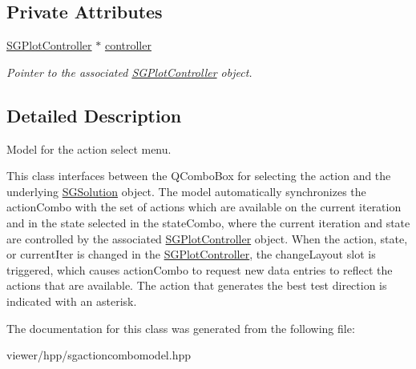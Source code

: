 \subsection*{Private Attributes}
\begin{DoxyCompactItemize}
\item 
\mbox{\label{classSGActionComboModel_ab390b51f00169a101b370ebdb6cf5d5f}} 
\hyperlink{classSGPlotController}{S\+G\+Plot\+Controller} $\ast$ \hyperlink{classSGActionComboModel_ab390b51f00169a101b370ebdb6cf5d5f}{controller}
\begin{DoxyCompactList}\small\item\em Pointer to the associated \hyperlink{classSGPlotController}{S\+G\+Plot\+Controller} object. \end{DoxyCompactList}\end{DoxyCompactItemize}


\subsection{Detailed Description}
Model for the action select menu. 

This class interfaces between the Q\+Combo\+Box for selecting the action and the underlying \hyperlink{classSGSolution}{S\+G\+Solution} object. The model automatically synchronizes the action\+Combo with the set of actions which are available on the current iteration and in the state selected in the state\+Combo, where the current iteration and state are controlled by the associated \hyperlink{classSGPlotController}{S\+G\+Plot\+Controller} object. When the action, state, or current\+Iter is changed in the \hyperlink{classSGPlotController}{S\+G\+Plot\+Controller}, the change\+Layout slot is triggered, which causes action\+Combo to request new data entries to reflect the actions that are available. The action that generates the best test direction is indicated with an asterisk. 

The documentation for this class was generated from the following file\+:\begin{DoxyCompactItemize}
\item 
viewer/hpp/sgactioncombomodel.\+hpp\end{DoxyCompactItemize}
